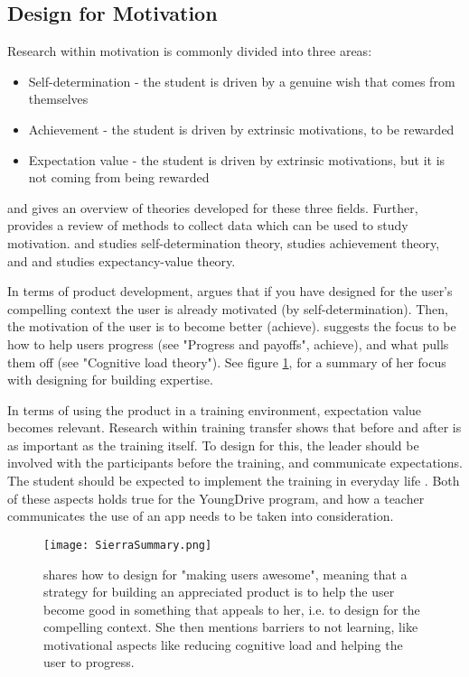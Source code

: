 \subsection{Design for Motivation}\label{sec:motivation}

Research within motivation is commonly divided into three areas:

\begin{itemize}
\item Self-determination - the student is driven by a genuine wish that comes from themselves
\item Achievement - the student is driven by extrinsic motivations, to be rewarded
\item Expectation value - the student is driven by extrinsic motivations, but it is not coming from being rewarded
\end{itemize}

\cite{koballa} and \cite{abell} gives an overview of theories developed for these three fields. Further, \cite{fulmer} provides a review of methods to collect data which can be used to study motivation. \cite{deci} and \cite{ryan} studies self-determination theory, \cite{elliot} studies achievement theory, and \cite{eccles} and \cite{wigfield} studies expectancy-value theory.

In terms of product development, \cite{sierra} argues that if you have designed for the user's compelling context the user is already motivated (by self-determination). Then, the motivation of the user is to become better (achieve). \cite{sierra} suggests the focus to be how to help users progress (see "Progress and payoffs", achieve), and what pulls them off (see "Cognitive load theory"). See figure \ref{fig:sierra-summary}, for a summary of her focus with designing for building expertise.

In terms of using the product in a training environment, expectation value becomes relevant. Research within training transfer \citep{brinkerhoff} shows that before and after is as important as the training itself. To design for this, the leader should be involved with the participants before the training, and communicate expectations. The student should be expected to implement the training in everyday life \citep{brinkerhoff}. Both of these aspects holds true for the YoungDrive program, and how a teacher communicates the use of an app needs to be taken into consideration.

\begin{figure}[h]
  \centering
  \texttt{[image: SierraSummary.png]}
  \caption{\cite{sierra} shares how to design for "making users awesome", meaning that a strategy for building an appreciated product is to help the user become good in something that appeals to her, i.e. to design for the compelling context. She then mentions barriers to not learning, like motivational aspects like reducing cognitive load and helping the user to progress.}
  \label{fig:sierra-summary}
\end{figure}

